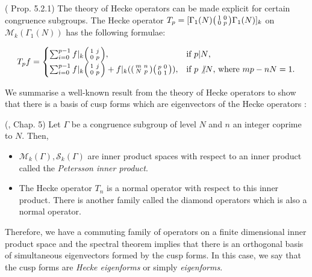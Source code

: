 \begin{example} (\cite{Shurman} Prop. 5.2.1)
The theory of Hecke operators can be made explicit for certain congruence subgroups. The Hecke operator $T_p = [ \Gamma_1(N) \begin{psmallmatrix} 1 & 0 \\ 0 & p \end{psmallmatrix} \Gamma_1(N)]_k $ on $\mathcal{M}_k(\Gamma_1(N))$ has the following formulae:

\[T_p f =
\begin{cases}
\sum_{i = 0}^{p-1} f|_k \begin{psmallmatrix}
    1 & j \\ 0 & p \end{psmallmatrix}, & \text{if $p | N$,} \\
\sum_{i = 0}^{p-1} f|_k \begin{psmallmatrix}
    1 & j \\ 0 & p \end{psmallmatrix} + f|_k (\begin{psmallmatrix} m & n \\ N & p \end{psmallmatrix} \begin{psmallmatrix}
        p & 0 \\ 0 & 1
    \end{psmallmatrix}), & \text{if $p\not | N$, where $mp - nN = 1$.} \\
\end{cases} 
\]
\end{example}

We summarise a well-known result from the theory of Hecke operators to show that there is a basis of cusp forms which are eigenvectors of the Hecke operators \cite{Shurman}:

\begin{theorem}{(\cite{Shurman}, Chap. 5)}
Let $\Gamma$ be a congruence subgroup of level $N$ and $n$ an integer coprime to $N$. Then,

\begin{itemize}
\item $\mathcal{M}_k(\Gamma),\mathcal{S}_k(\Gamma)$ are inner product spaces with respect to an inner product called the \textit{Petersson inner product}.
\item The Hecke operator $T_n$ is a normal operator with respect to this inner product. There is another family called the diamond operators which is also a normal operator.
\end{itemize}

Therefore, we have a commuting family of operators on a finite dimensional inner product space and the spectral theorem implies that there is an orthogonal basis of simultaneous eigenvectors formed by the cusp forms. In this case, we say that the cusp forms are \textit{Hecke eigenforms} or simply \textit{eigenforms}.
\end{theorem}

